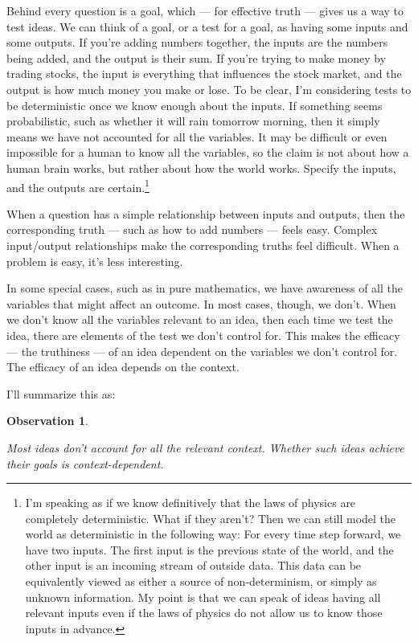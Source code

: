 \documentclass[11pt, oneside]{article}
\newtheorem{obs}{Observation}
\begin{document}
Behind every question is a goal, which --- for effective truth --- gives
us a way to test ideas.
We can think of a goal, or a test for a goal, as having some inputs
and some outputs.
If you're adding numbers together,
the inputs are the numbers being added, and
the output is their sum.
If you're trying to make money by trading stocks,
the input is everything
that influences the stock market,
and the output is how much
money you make or lose.
To be clear, I'm considering tests to be deterministic once we know enough
about the inputs.
If something seems probabilistic,
such as whether it will
rain tomorrow morning, then it simply means we have not accounted for all
the variables.
It may be difficult or even impossible for a human to know all
the variables, so the claim is not about how a human brain works, but rather
about how the world works.
Specify the inputs, and the outputs are certain.\footnote{I'm speaking as if we
know definitively that the laws of physics are completely deterministic. What if
they aren't? Then we can still model the world as deterministic in the following
way: For every time step forward, we have two inputs. The first input is the
previous state of the world, and the other input is an incoming stream of
outside data. This data can be equivalently viewed as either a source of
non-determinism, or simply as unknown information. My point is that we can speak
of
ideas having all relevant inputs even if the laws of physics do not allow us to
know those inputs in advance.}

When a question has a simple relationship between inputs and outputs, then the
corresponding truth --- such as how to add numbers --- feels easy. Complex
input/output relationships make the corresponding truths feel difficult.
When a problem is easy, it's less interesting.

In some special cases, such as in pure mathematics,
we have awareness of all the variables that might affect an outcome.
In most cases, though, we don't.
When we don't know all the variables relevant to an idea, then each time we
test the idea, there are elements of the test we don't control for.
This makes the efficacy --- the truthiness --- of an idea dependent on the
variables we don't control for. The efficacy of an idea
depends on the context.

I'll summarize this as:
\newcommand{\obssix}{
    Most ideas don't account for all the relevant context.
    Whether such ideas achieve their goals is context-dependent.
}
\begin{obs}\label{o6}
    \obssix
\end{obs}
\end{document}
